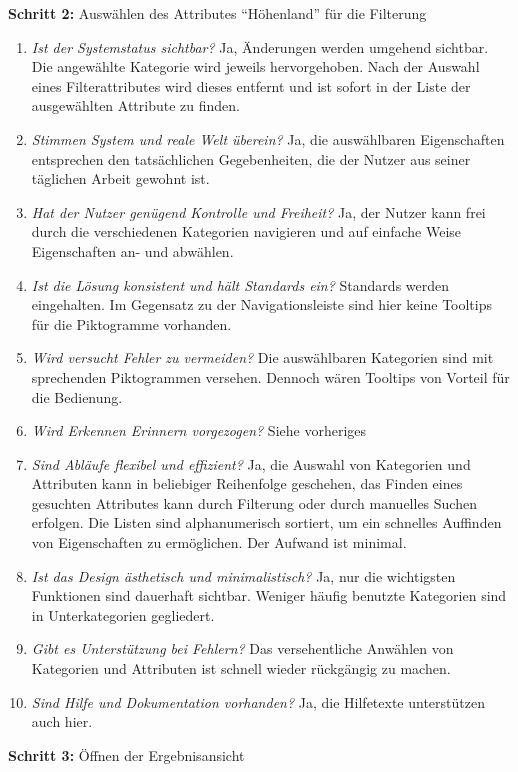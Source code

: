 \textbf{Schritt 2:} Auswählen des Attributes \enquote{Höhenland} für die Filterung
\begin{enumerate}
 \item \textit{Ist der Systemstatus sichtbar?} Ja, Änderungen werden umgehend sichtbar. Die angewählte Kategorie wird jeweils hervorgehoben. Nach der Auswahl eines Filterattributes wird dieses entfernt und ist sofort in der Liste der ausgewählten Attribute zu finden.
 \item \textit{Stimmen System und reale Welt überein?} Ja, die auswählbaren Eigenschaften entsprechen den tatsächlichen Gegebenheiten, die der Nutzer aus seiner täglichen Arbeit gewohnt ist.
 \item \textit{Hat der Nutzer genügend Kontrolle und Freiheit?} Ja, der Nutzer kann frei durch die verschiedenen Kategorien navigieren und auf einfache Weise Eigenschaften an- und abwählen.
 \item \textit{Ist die Lösung konsistent und hält Standards ein?} Standards werden eingehalten. Im Gegensatz zu der Navigationsleiste sind hier keine Tooltips für die Piktogramme vorhanden.
 \item \textit{Wird versucht Fehler zu vermeiden?} Die auswählbaren Kategorien sind mit sprechenden Piktogrammen versehen. Dennoch wären Tooltips von Vorteil für die Bedienung.
 \item \textit{Wird Erkennen Erinnern vorgezogen?} Siehe vorheriges
 \item \textit{Sind Abläufe flexibel und effizient?} Ja, die Auswahl von Kategorien und Attributen kann in beliebiger Reihenfolge geschehen, das Finden eines gesuchten Attributes kann durch Filterung oder durch manuelles Suchen erfolgen. Die Listen sind alphanumerisch sortiert, um ein schnelles Auffinden von Eigenschaften zu ermöglichen. Der Aufwand ist minimal.
 \item \textit{Ist das Design ästhetisch und minimalistisch?} Ja, nur die wichtigsten Funktionen sind dauerhaft sichtbar. Weniger häufig benutzte Kategorien sind in Unterkategorien gegliedert.
 \item \textit{Gibt es Unterstützung bei Fehlern?} Das versehentliche Anwählen von Kategorien und Attributen ist schnell wieder rückgängig zu machen.
 \item \textit{Sind Hilfe und Dokumentation vorhanden?} Ja, die Hilfetexte unterstützen auch hier.
\end{enumerate}
\textbf{Schritt 3:} Öffnen der Ergebnisansicht
